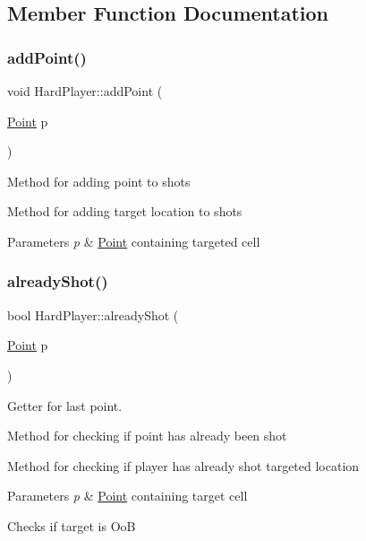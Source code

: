 \subsection{Member Function Documentation}
\mbox{\label{class_hard_player_a77c82c1a36c9e956fdab98837ed888e5}} 
\subsubsection{\texorpdfstring{add\+Point()}{addPoint()}}
{\footnotesize\ttfamily void Hard\+Player\+::add\+Point (\begin{DoxyParamCaption}\item[{\mbox{\hyperlink{class_point}{Point}}}]{p }\end{DoxyParamCaption})\hspace{0.3cm}{\ttfamily [virtual]}}

Method for adding point to shots

Method for adding target location to shots 
\begin{DoxyParams}{Parameters}
{\em p} & \mbox{\hyperlink{class_point}{Point}} containing targeted cell \\
\hline
\end{DoxyParams}
\mbox{\label{class_hard_player_a8107a94c8db7d5f1023dbeeddfaaedb2}} 
\subsubsection{\texorpdfstring{already\+Shot()}{alreadyShot()}}
{\footnotesize\ttfamily bool Hard\+Player\+::already\+Shot (\begin{DoxyParamCaption}\item[{\mbox{\hyperlink{class_point}{Point}}}]{p }\end{DoxyParamCaption})\hspace{0.3cm}{\ttfamily [virtual]}}



Getter for last point. 

Method for checking if point has already been shot

Method for checking if player has already shot targeted location 
\begin{DoxyParams}{Parameters}
{\em p} & \mbox{\hyperlink{class_point}{Point}} containing target cell \\
\hline
\end{DoxyParams}
Checks if target is OoB

